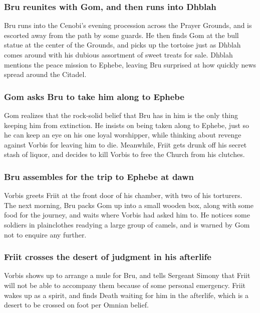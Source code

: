 \subsubsection{\Gls{Bru} reunites with \Gls{Gom}, and then runs into \Gls{Dhblah}}
\Gls{Bru} runs into the \Gls{Cenobi}'s evening procession across the Prayer Grounds, and is escorted
away from the path by some guards. He then finds \Gls{Gom} at the bull statue at the center of the
Grounds, and picks up the tortoise just as \Gls{Dhblah} comes around with his dubious assortment
of sweet treats for sale. \Gls{Dhblah} mentions the peace mission to Ephebe, leaving \Gls{Bru}
surprised at how quickly news spread around the Citadel.

\subsubsection{\Gls{Gom} asks \Gls{Bru} to take him along to Ephebe}
\Gls{Gom} realizes that the rock-solid belief that \Gls{Bru} has in him is the only thing keeping
him from extinction. He insists on being taken along to Ephebe, just so he can keep an eye on his
one loyal worshipper, while thinking about revenge against \Gls{Vorbis} for leaving him to die.
Meanwhile, \Gls{Friit} gets drunk off his secret stash of liquor, and decides to kill \Gls{Vorbis}
to free the Church from his clutches.

\subsubsection{\Gls{Bru} assembles for the trip to Ephebe at dawn}
\Gls{Vorbis} greets \Gls{Friit} at the front door of his chamber, with two of his torturers.
The next morning, \Gls{Bru} packs \Gls{Gom} up into a small wooden box, along with some food for the
journey, and waits where \Gls{Vorbis} had asked him to. He notices some soldiers in plainclothes
readying a large group of camels, and is warned by \Gls{Gom} not to enquire any further.

\subsubsection{\Gls{Friit} crosses the desert of judgment in his afterlife}
\Gls{Vorbis} shows up to arrange a mule for \Gls{Bru}, and tells Sergeant \Gls{Simony} that
\Gls{Friit} will not be able to accompany them because of some personal emergency. \Gls{Friit}
wakes up as a spirit, and finds \Gls{Death} waiting for him in the afterlife, which is a desert to
be crossed on foot per Omnian belief.

